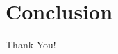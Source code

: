 \documentclass[mathserif]{beamer}
\begin{document}
\section{Conclusion}
\begin{frame}
\begin{center}{\Large Thank You!}\end{center}
\end{frame}
\end{document}
